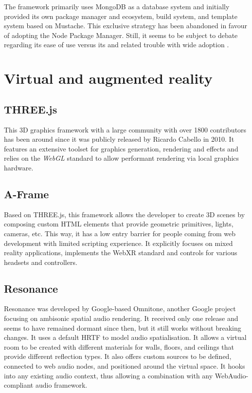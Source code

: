 The framework primarily uses MongoDB as a database system and initially provided its own package manager and ecosystem, build system, and template system based on Mustache. This exclusive strategy has been abandoned in favour of adopting the Node Package Manager. Still, it seems to be subject to debate regarding its ease of use versus its  and related trouble with wide adoption \parencite{meteorDiscussionYCombinator}.



\section{Virtual and augmented reality}

\subsection{THREE.js}

This \ac{3D} graphics framework with a large community with over 1800 contributors has been around since it was publicly released by Ricardo Cabello in 2010. It features an extensive toolset for graphics generation, rendering and effects and relies on the \emph{WebGL} standard to allow performant rendering via local graphics hardware.

\subsection{A-Frame}

Based on THREE.js, this framework allows the developer to create \ac{3D} scenes by composing custom HTML elements that provide geometric primitives, lights, cameras, etc. This way, it has a low entry barrier for people coming from web development with limited scripting experience. It explicitly focuses on mixed reality applications, implements the WebXR standard and controls for various headsets and controllers.

\subsection{Resonance}

Resonance was developed by Google-based Omnitone, another Google project focusing on ambisonic spatial audio rendering. It received only one release and seems to have remained dormant since then, but it still works without breaking changes. It uses a default \ac{HRTF} to model audio spatialisation. It allows a virtual room to be created with different materials for walls, floors, and ceilings that provide different reflection types. It also offers custom sources to be defined, connected to web audio nodes, and positioned around the virtual space. It hooks into any existing audio context, thus allowing a combination with any WebAudio-compliant audio framework.

